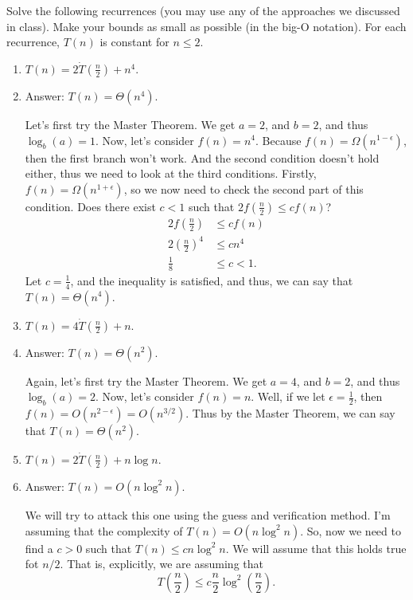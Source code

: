 \documentclass{article}
\begin{document}
\section{}
 Solve the following recurrences (you may use any of the approaches we
 discussed in class). Make your bounds as small as possible (in the
 big-O notation). For each recurrence, $T(n)$ is constant for $n \le
 2$.  

 \begin{enumerate}[label=(\alph*)]
 \item $T(n) = 2\dot T\left(\frac{n}{2}\right) + n^4$.
 \item[] Answer: $T(n) = \Theta(n^4)$.

   Let's first try the Master Theorem.  We get $a = 2$, and $b = 2$,
   and thus $ \log_b(a) = 1$. Now, let's consider $f(n) = n^4$.
   Because $f(n) = \Omega(n^{1-\epsilon})$, then the first branch
   won't work.  And the second condition doesn't hold either, thus we
   need to look at the third conditions. Firstly, $f(n) =
   \Omega(n^{1+\epsilon})$, so we now need to check the second part of
   this condition.  Does there exist $c < 1$ such that $2f(\frac{n}{2})
   \le cf(n)$?
   \begin{equation}
     \begin{split}
     2f\left(\frac{n}{2}\right) &\le c f(n)\\
     2\left(\frac{n}{2}\right)^4 &\le cn^4\\
     \frac{1}{8} & \le c < 1.
     \end{split}
   \end{equation}
Let $c = \frac{1}{4}$, and the inequality is satisfied, and thus, we
can say that $T(n) = \Theta(n^4)$.
 \item $T(n) = 4\dot T\left(\frac{n}{2}\right) + n$.
 \item[] Answer: $T(n) = \Theta(n^2)$.

   Again, let's first try the Master Theorem.  We get $a = 4$, and $b
   = 2$, and thus $ \log_b(a) = 2$. Now, let's consider $f(n) = n$. 
   Well, if we let $\epsilon = \frac{1}{2}$, then $f(n) = O(n^{2 -
     \epsilon}) = O(n^{3/2})$.  Thus by the Master Theorem, we can say
   that $T(n) = \Theta(n^2)$.

 \item $T(n) = 2\dot T\left(\frac{n}{2}\right) + n\log n$.
 \item[] Answer: $T(n) = O(n\log^2 n)$.

   We will try to attack this one using the guess and verification
   method. I'm assuming that the complexity of $T(n) = O(n\log^2
   n)$. So, now we need to find a $c > 0$ such that $T(n) \le cn\log^2
   n$. We will assume that this holds true fot $n/2$. That is,
   explicitly, we are assuming that 
   \begin{equation}
     T\left(\frac{n}{2}\right) \le c
     \frac{n}{2}\log^2\left(\frac{n}{2}\right).
   \end{equation}
   

\end{enumerate}
\end{document}
